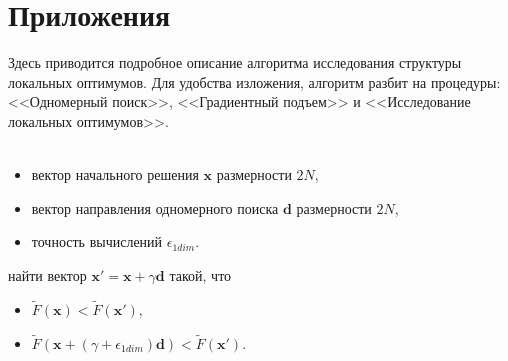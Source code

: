 \chapter*{Приложения}
\label{sec:applic_a}

Здесь приводится подробное описание алгоритма исследования структуры локальных оптимумов. Для удобства изложения, алгоритм разбит
на процедуры: <<Одномерный поиск>>, <<Градиентный подъем>> и <<Исследование локальных оптимумов>>.
\\ \\

\begin{itemize}
  \item вектор начального решения $\textbf{x}$ размерности $2N$,
  \item вектор направления одномерного поиска $\textbf{d}$ размерности $2N$,
  \item точность вычислений $\epsilon_{1dim}$.
\end{itemize}
 найти вектор $\textbf{x}' = \textbf{x} + \gamma \textbf{d}$ такой, что
\begin{itemize}
  \item $\tilde{F}(\textbf{x}) < \tilde{F}(\textbf{x}'),$
  \item $\tilde{F}(\textbf{x} + (\gamma + \epsilon_{1dim}) \textbf{d}) < \tilde{F}(\textbf{x}').$
\end{itemize}
